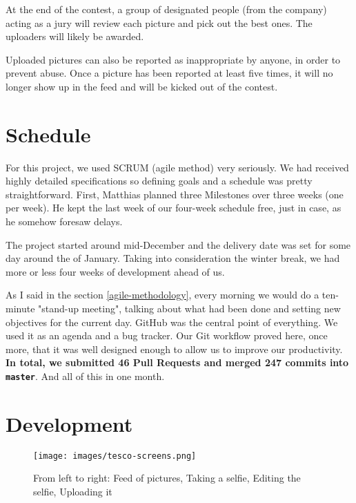 \medskip

At the end of the contest, a group of designated people (from the company) acting as a jury will review each picture and pick out the best ones. The uploaders will likely be awarded.

\medskip

Uploaded pictures can also be reported as inappropriate by anyone, in order to prevent abuse. Once a picture has been reported at least five times, it will no longer show up in the feed and will be kicked out of the contest.

\section{Schedule}

For this project, we used \textsc{SCRUM} (agile method) very seriously. We had received highly detailed specifications so defining goals and a schedule was pretty straightforward. First, Matthias planned three Milestones over three weeks (one per week). He kept the last week of our four-week schedule free, just in case, as he somehow foresaw delays.

\medskip

The project started around mid-December and the delivery date was set for some day around the  of January. Taking into consideration the winter break, we had more or less four weeks of development ahead of us.

\medskip

As I said in the section \ref{agile-methodology}, every morning we would do a ten-minute "stand-up meeting", talking about what had been done and setting new objectives for the current day. GitHub was the central point of everything. We used it as an agenda and a bug tracker. Our Git workflow proved here, once more, that it was well designed enough to allow us to improve our productivity. \textbf{In total, we submitted 46 Pull Requests and merged 247 commits into \lstinline{master}}. And all of this in one month.

\section{Development}

\begin{figure}[H]
   \centering\texttt{[image: images/tesco-screens.png]}
   \caption[The different pages of the app DC Comics]{From left to right: Feed of pictures, Taking a selfie, Editing the selfie, Uploading it}
\end{figure}

